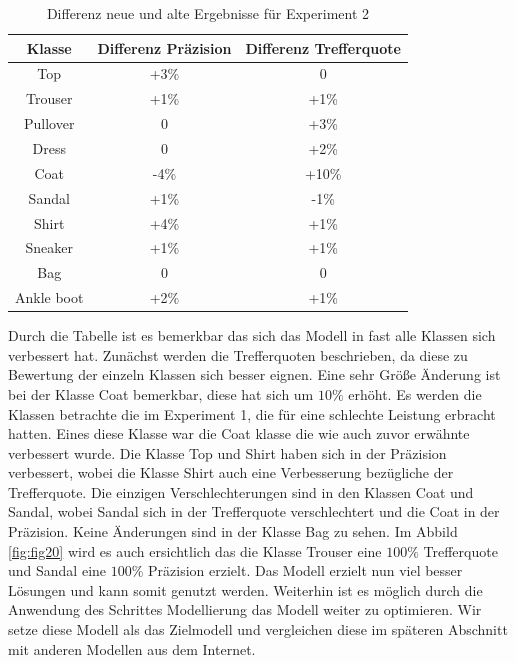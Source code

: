 \documentclass[12pt]{scrreprt}
\begin{document}
\begin{table}[h!]
	\begin{center}
		\begin{tabular}{|c|c|c|}
			\hline
			Klasse & Differenz Präzision & Differenz Trefferquote \\
			\hline
			Top  & +3\% & 0\\
			\hline
			Trouser  & +1\% & +1\%  \\
			\hline
			Pullover   & 0 & +3\% \\
			\hline
			Dress   & 0 & +2\% \\
			\hline
			Coat   & -4\% & +10\% \\
			\hline
			Sandal & +1\% & -1\% \\
			\hline
			Shirt & +4\% & +1\% \\
			\hline
			Sneaker & +1\% & +1\% \\
			\hline
			Bag & 0 & 0 \\
			\hline
			Ankle boot & +2\% & +1\% \\
			\hline
		\end{tabular}
		\caption{Differenz neue und alte Ergebnisse für Experiment 2}
		\label{tab:differenz2}
	\end{center}
\end{table}

Durch die Tabelle ist es bemerkbar das sich das Modell in fast alle Klassen sich verbessert hat. Zunächst werden die Trefferquoten beschrieben, da diese zu Bewertung der einzeln Klassen sich besser eignen. Eine sehr Größe Änderung ist bei der Klasse Coat bemerkbar, diese hat sich um $10\%$ erhöht. Es werden die Klassen betrachte die im Experiment 1, die für eine schlechte Leistung erbracht hatten. Eines diese Klasse war die Coat klasse die wie auch zuvor erwähnte verbessert wurde. Die Klasse Top und Shirt haben sich in der Präzision verbessert, wobei die Klasse Shirt auch eine Verbesserung bezügliche der Trefferquote. Die einzigen Verschlechterungen sind in den Klassen Coat und Sandal, wobei Sandal sich in der Trefferquote verschlechtert und die Coat in der Präzision. Keine Änderungen sind in der Klasse Bag zu sehen. Im Abbild \ref{fig:fig20} wird es auch ersichtlich das die Klasse Trouser eine $100\%$ Trefferquote und Sandal eine $100\%$ Präzision erzielt. Das Modell erzielt nun viel besser Lösungen und kann somit genutzt werden. Weiterhin ist es möglich durch die Anwendung des Schrittes Modellierung das Modell weiter zu optimieren. Wir setze diese Modell als das Zielmodell und vergleichen diese im späteren Abschnitt mit anderen Modellen aus dem Internet.
\end{document}
